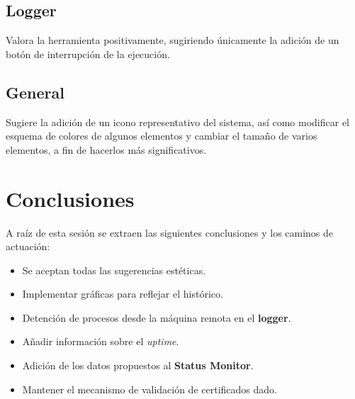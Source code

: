 \subsection{Logger}

Valora la herramienta positivamente, sugiriendo únicamente la adición de un botón de interrupción de la ejecución.

\subsection{General}

Sugiere la adición de un icono representativo del sistema, así como modificar el esquema de colores de algunos elementos y cambiar el tamaño de varios elementos, a fin de hacerlos más significativos.


\section{Conclusiones}

A raíz de esta sesión se extraen las siguientes conclusiones y los caminos de actuación:

\begin{itemize}
	\item Se aceptan todas las sugerencias estéticas.
	\item Implementar gráficas para reflejar el histórico.
	\item Detención de procesos desde la máquina remota en el \textbf{logger}.
	\item Añadir información sobre el \textit{uptime}.
	\item Adición de los datos propuestos al \textbf{Status Monitor}.
	\item Mantener el mecanismo de validación de certificados dado.
\end{itemize}




